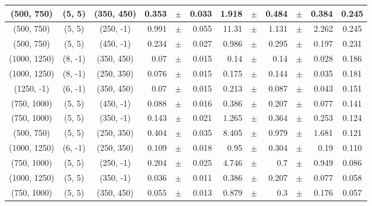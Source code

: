 \documentclass[12pt]{paper}
\begin{document}
\begin{table}[ht]
\begin{center}
{\begin{tabular}{|c|c|c|rrr|rrrrr|c|}
(500, 750)&(5, 5)&(350, 450)&0.353&$\pm$&0.033&1.918&$\pm$&0.484&$\pm$&0.384&0.245\\\hline
(500, 750)&(5, 5)&(250, -1)&0.991&$\pm$&0.055&11.31&$\pm$&1.131&$\pm$&2.262&0.245\\\hline
(500, 750)&(5, 5)&(450, -1)&0.234&$\pm$&0.027&0.986&$\pm$&0.295&$\pm$&0.197&0.231\\\hline
(1000, 1250)&(8, -1)&(350, 450)&0.07&$\pm$&0.015&0.14&$\pm$&0.14&$\pm$&0.028&0.186\\\hline
(1000, 1250)&(8, -1)&(250, 350)&0.076&$\pm$&0.015&0.175&$\pm$&0.144&$\pm$&0.035&0.181\\\hline
(1250, -1)&(6, -1)&(350, 450)&0.07&$\pm$&0.015&0.213&$\pm$&0.087&$\pm$&0.043&0.151\\\hline
(750, 1000)&(5, 5)&(450, -1)&0.088&$\pm$&0.016&0.386&$\pm$&0.207&$\pm$&0.077&0.141\\\hline
(750, 1000)&(5, 5)&(350, -1)&0.143&$\pm$&0.021&1.265&$\pm$&0.364&$\pm$&0.253&0.124\\\hline
(500, 750)&(5, 5)&(250, 350)&0.404&$\pm$&0.035&8.405&$\pm$&0.979&$\pm$&1.681&0.121\\\hline
(1000, 1250)&(6, -1)&(250, 350)&0.109&$\pm$&0.018&0.95&$\pm$&0.304&$\pm$&0.19&0.110\\\hline
(750, 1000)&(5, 5)&(250, -1)&0.204&$\pm$&0.025&4.746&$\pm$&0.7&$\pm$&0.949&0.086\\\hline
(1000, 1250)&(5, 5)&(350, -1)&0.036&$\pm$&0.011&0.386&$\pm$&0.207&$\pm$&0.077&0.058\\\hline
(750, 1000)&(5, 5)&(350, 450)&0.055&$\pm$&0.013&0.879&$\pm$&0.3&$\pm$&0.176&0.057\\\hline

\end{tabular}}
\end{center}
\end{table}
\end{document}
